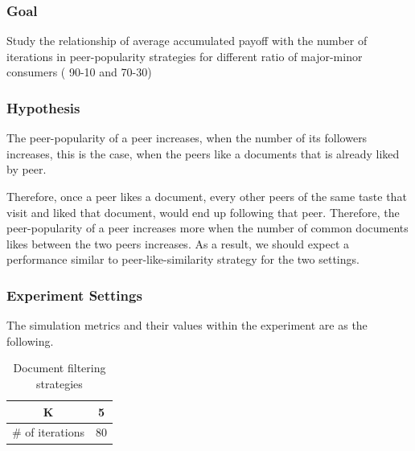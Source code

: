 \documentclass [12pt]{article} \usepackage{multicol}
\begin{document}
\subsubsection{Goal}

 Study the relationship of average accumulated payoff with the number of iterations  
in peer-popularity strategies for different ratio of major-minor consumers ( 90-10 and 70-30)

\subsubsection{Hypothesis}
The peer-popularity of a peer increases, when the number of its followers increases, 
this is the case, when the peers like a documents that is already liked by peer. 

Therefore, once a peer likes a document, every other peers of the same taste that visit and liked that document, would end up
following that peer. Therefore, the peer-popularity of a peer increases more when the number of common documents likes between the 
two peers increases. As a result, we should expect a performance similar to peer-like-similarity strategy for the two settings. 



\subsubsection{Experiment Settings}

The simulation metrics and their values within the experiment are as the following.

\begin{table}[h!]
\caption{Document filtering strategies}
\begin{center}


\begin{tabular}{|c|c|}
\hline
K   & 5 \\ \hline
\# of iterations & 80 \\ \hline
\end{tabular}


\end{center}
\label{default}
\end{table}
\end{document}
